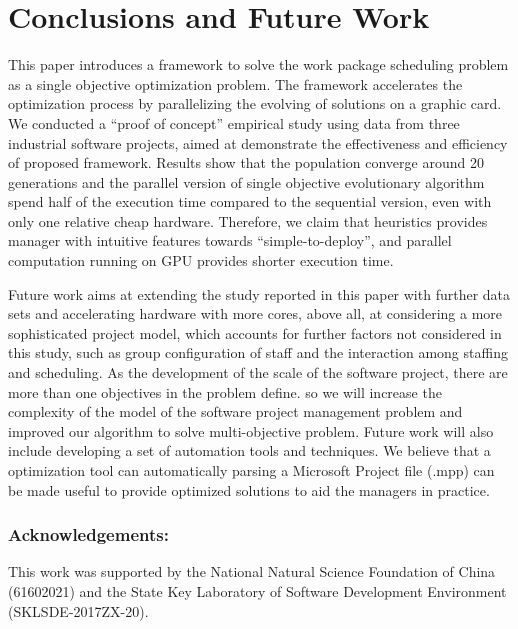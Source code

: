 %
%

\section{Conclusions and Future Work}
\vspace{-2mm}

This paper introduces a framework to solve the work package scheduling problem as a single objective optimization problem. The framework accelerates the optimization process by parallelizing the evolving of solutions on a graphic card. 
We conducted a ``proof of concept'' empirical study using data from three industrial software projects, aimed at demonstrate the effectiveness and efficiency of proposed framework.
Results show that the population converge around 20 generations and the parallel version of single objective evolutionary algorithm spend half of the execution time compared to the sequential version, even with only one relative cheap hardware. 
Therefore, we claim that heuristics provides manager with intuitive features towards ``simple-to-deploy'', and parallel computation running on GPU provides shorter execution time.

Future work aims at extending the study reported in this paper with further data sets and accelerating hardware with more cores, above all, at considering a more sophisticated project model, which accounts for further factors not considered in this study, such as group configuration of staff and the interaction among staffing and scheduling.
As the development of the scale of the software project, there are more than one objectives in the problem define. so we will increase the complexity of the model of the software project management problem and improved our algorithm to solve multi-objective problem.
Future work will also include developing a set of automation tools and techniques. We believe that a optimization tool can automatically parsing a Microsoft Project file (.mpp) can be made useful to provide optimized solutions to aid the managers in practice.
\vspace{-4mm}
\subsubsection{\small{Acknowledgements:}} \small{This work was supported by the National Natural Science Foundation of China (61602021) and the State Key Laboratory of Software Development Environment (SKLSDE-2017ZX-20).}
\vspace{-3mm}

